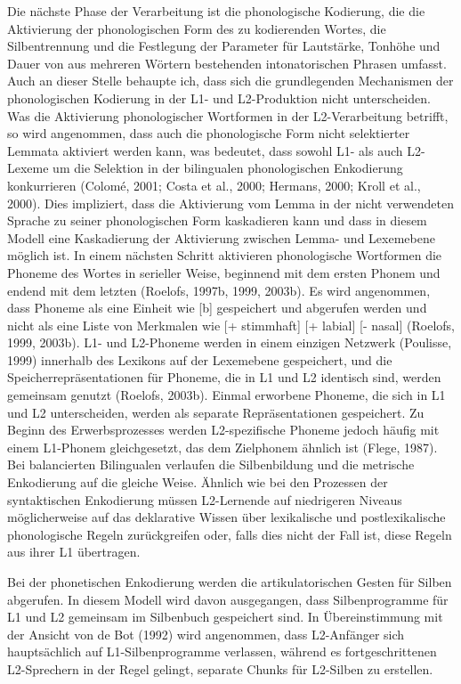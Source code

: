 \documentclass[
  letterpaper,
]{scrbook}
\begin{document}
Die nächste Phase der Verarbeitung ist die phonologische Kodierung, die
die Aktivierung der phonologischen Form des zu kodierenden Wortes, die
Silbentrennung und die Festlegung der Parameter für Lautstärke, Tonhöhe
und Dauer von aus mehreren Wörtern bestehenden intonatorischen Phrasen
umfasst. Auch an dieser Stelle behaupte ich, dass sich die grundlegenden
Mechanismen der phonologischen Kodierung in der L1- und L2-Produktion
nicht unterscheiden. Was die Aktivierung phonologischer Wortformen in
der L2-Verarbeitung betrifft, so wird angenommen, dass auch die
phonologische Form nicht selektierter Lemmata aktiviert werden kann, was
bedeutet, dass sowohl L1- als auch L2-Lexeme um die Selektion in der
bilingualen phonologischen Enkodierung konkurrieren (Colomé, 2001; Costa
et al., 2000; Hermans, 2000; Kroll et al., 2000). Dies impliziert, dass
die Aktivierung vom Lemma in der nicht verwendeten Sprache zu seiner
phonologischen Form kaskadieren kann und dass in diesem Modell eine
Kaskadierung der Aktivierung zwischen Lemma- und Lexemebene möglich ist.
In einem nächsten Schritt aktivieren phonologische Wortformen die
Phoneme des Wortes in serieller Weise, beginnend mit dem ersten Phonem
und endend mit dem letzten (Roelofs, 1997b, 1999, 2003b). Es wird
angenommen, dass Phoneme als eine Einheit wie {[}b{]} gespeichert und
abgerufen werden und nicht als eine Liste von Merkmalen wie {[}+
stimmhaft{]} {[}+ labial{]} {[}- nasal{]} (Roelofs, 1999, 2003b). L1-
und L2-Phoneme werden in einem einzigen Netzwerk (Poulisse, 1999)
innerhalb des Lexikons auf der Lexemebene gespeichert, und die
Speicherrepräsentationen für Phoneme, die in L1 und L2 identisch sind,
werden gemeinsam genutzt (Roelofs, 2003b). Einmal erworbene Phoneme, die
sich in L1 und L2 unterscheiden, werden als separate Repräsentationen
gespeichert. Zu Beginn des Erwerbsprozesses werden L2-spezifische
Phoneme jedoch häufig mit einem L1-Phonem gleichgesetzt, das dem
Zielphonem ähnlich ist (Flege, 1987). Bei balancierten Bilingualen
verlaufen die Silbenbildung und die metrische Enkodierung auf die
gleiche Weise. Ähnlich wie bei den Prozessen der syntaktischen
Enkodierung müssen L2-Lernende auf niedrigeren Niveaus möglicherweise
auf das deklarative Wissen über lexikalische und postlexikalische
phonologische Regeln zurückgreifen oder, falls dies nicht der Fall ist,
diese Regeln aus ihrer L1 übertragen.

Bei der phonetischen Enkodierung werden die artikulatorischen Gesten für
Silben abgerufen. In diesem Modell wird davon ausgegangen, dass
Silbenprogramme für L1 und L2 gemeinsam im Silbenbuch gespeichert sind.
In Übereinstimmung mit der Ansicht von de Bot (1992) wird angenommen,
dass L2-Anfänger sich hauptsächlich auf L1-Silbenprogramme verlassen,
während es fortgeschrittenen L2-Sprechern in der Regel gelingt, separate
Chunks für L2-Silben zu erstellen.
\end{document}
